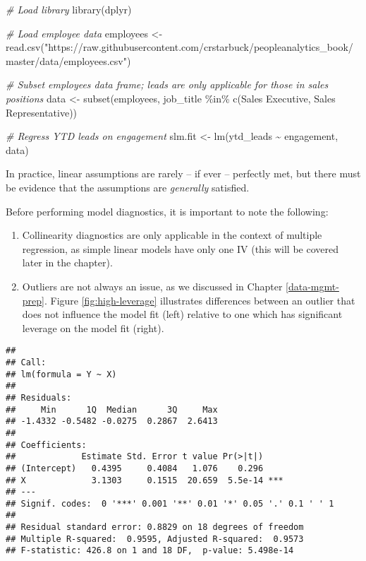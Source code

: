 \documentclass[
]{book}
\newenvironment{Shaded}{\begin{snugshade}}{\end{snugshade}}
\newcommand{\CommentTok}[1]{\textcolor[rgb]{0.56,0.35,0.01}{\textit{#1}}}
\newcommand{\FunctionTok}[1]{\textcolor[rgb]{0.00,0.00,0.00}{#1}}
\newcommand{\NormalTok}[1]{#1}
\newcommand{\OtherTok}[1]{\textcolor[rgb]{0.56,0.35,0.01}{#1}}
\newcommand{\SpecialCharTok}[1]{\textcolor[rgb]{0.00,0.00,0.00}{#1}}
\newcommand{\StringTok}[1]{\textcolor[rgb]{0.31,0.60,0.02}{#1}}
\providecommand{\tightlist}{%
  \setlength{\itemsep}{0pt}\setlength{\parskip}{0pt}}
\begin{document}
\begin{Shaded}
\begin{Highlighting}[]
\CommentTok{\# Load library}
\FunctionTok{library}\NormalTok{(dplyr)}

\CommentTok{\# Load employee data}
\NormalTok{employees }\OtherTok{\textless{}{-}} \FunctionTok{read.csv}\NormalTok{(}\StringTok{"https://raw.githubusercontent.com/crstarbuck/peopleanalytics\_book/master/data/employees.csv"}\NormalTok{)}

\CommentTok{\# Subset employees data frame; leads are only applicable for those in sales positions}
\NormalTok{data }\OtherTok{\textless{}{-}} \FunctionTok{subset}\NormalTok{(employees, job\_title }\SpecialCharTok{\%in\%} \FunctionTok{c}\NormalTok{(}\StringTok{\textquotesingle{}Sales Executive\textquotesingle{}}\NormalTok{, }\StringTok{\textquotesingle{}Sales Representative\textquotesingle{}}\NormalTok{))}

\CommentTok{\# Regress YTD leads on engagement}
\NormalTok{slm.fit }\OtherTok{\textless{}{-}} \FunctionTok{lm}\NormalTok{(ytd\_leads }\SpecialCharTok{\textasciitilde{}}\NormalTok{ engagement, data)}
\end{Highlighting}
\end{Shaded}

In practice, linear assumptions are rarely -- if ever -- perfectly met, but there must be evidence that the assumptions are \emph{generally} satisfied.

Before performing model diagnostics, it is important to note the following:

\begin{enumerate}
\def\labelenumi{\arabic{enumi}.}
\tightlist
\item
  Collinearity diagnostics are only applicable in the context of multiple regression, as simple linear models have only one IV (this will be covered later in the chapter).
\item
  Outliers are not always an issue, as we discussed in Chapter \ref{data-mgmt-prep}. Figure \ref{fig:high-leverage} illustrates differences between an outlier that does not influence the model fit (left) relative to one which has significant leverage on the model fit (right).
\end{enumerate}

\begin{verbatim}
## 
## Call:
## lm(formula = Y ~ X)
## 
## Residuals:
##     Min      1Q  Median      3Q     Max 
## -1.4332 -0.5482 -0.0275  0.2867  2.6413 
## 
## Coefficients:
##             Estimate Std. Error t value Pr(>|t|)    
## (Intercept)   0.4395     0.4084   1.076    0.296    
## X             3.1303     0.1515  20.659  5.5e-14 ***
## ---
## Signif. codes:  0 '***' 0.001 '**' 0.01 '*' 0.05 '.' 0.1 ' ' 1
## 
## Residual standard error: 0.8829 on 18 degrees of freedom
## Multiple R-squared:  0.9595, Adjusted R-squared:  0.9573 
## F-statistic: 426.8 on 1 and 18 DF,  p-value: 5.498e-14
\end{verbatim}
\end{document}
